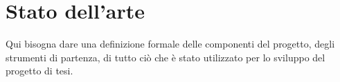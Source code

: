 \chapter{Stato dell'arte}\label{chap:Letteratura}
Qui bisogna dare una definizione formale delle componenti del progetto, degli 
strumenti di partenza, di tutto ciò che è stato utilizzato per lo sviluppo del
progetto di tesi.